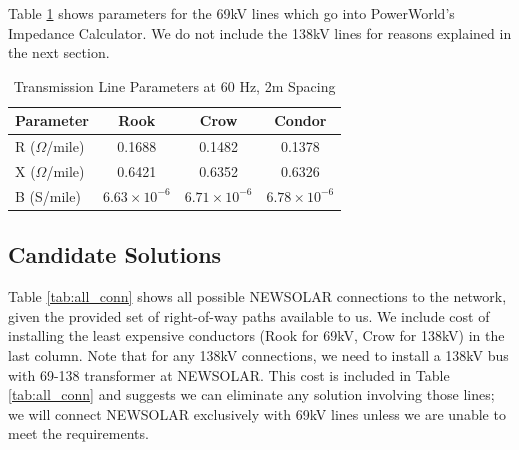 \documentclass[conference]{IEEEtran}
\begin{document}
Table \ref{tab:tl_params} shows parameters for the 69kV lines which go into PowerWorld's Impedance Calculator. We do not include the 138kV lines for reasons explained in the next section.
\begin{table}
	\centering
	\begin{tabular}{|l|c|c|c|}
		\hline
		Parameter & Rook & Crow & Condor \\
		\hline
		R ($\Omega$/mile) & 0.1688 & 0.1482 & 0.1378 \\
		X ($\Omega$/mile) & 0.6421 & 0.6352 & 0.6326 \\
		B (S/mile) & $6.63\times10^{-6}$ & $6.71\times10^{-6}$ & $6.78\times10^{-6}$ \\
		\hline
	\end{tabular}
	\vspace{0.5em}
	\caption{Transmission Line Parameters at 60 Hz, 2m Spacing}
	\label{tab:tl_params}
\end{table}
\subsection{Candidate Solutions}
Table \ref{tab:all_conn} shows all possible NEWSOLAR connections to the network, given the provided set of right-of-way paths available to us. We include cost of installing the least expensive conductors (Rook for 69kV, Crow for 138kV) in the last column. Note that for any 138kV connections, we need to install a 138kV bus with 69-138 transformer at NEWSOLAR. This cost is included in Table \ref{tab:all_conn} and suggests we can eliminate any solution involving those lines; we will connect NEWSOLAR exclusively with 69kV lines unless we are unable to meet the requirements. 
\end{document}
